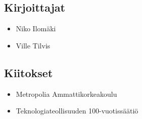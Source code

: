 \subsection*{Kirjoittajat}
\begin{itemize}
\item Niko Ilomäki
\item Ville Tilvis
\end{itemize}

\subsection*{Kiitokset}
\begin{itemize}
\item Metropolia Ammattikorkeakoulu %
\item Teknologiateollisuuden 100-vuotissäätiö %
\end{itemize}
